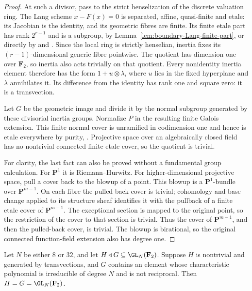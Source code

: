 \begin{proof}
At such a divisor, pass to the strict henselization of the discrete
valuation ring.  The Lang scheme $x-F(x)=0$ is separated, affine,
quasi-finite and etale: its Jacobian is the identity, and its
geometric fibres are finite.  Its finite etale part has rank
$2^{r-1}$ and is a subgroup, by
Lemma~\ref{lem:boundary-Lang-finite-part}, or directly by
\cite[Lemma~41.20.5]{Stacks0BTN} and
\cite[Lemma~58.8.2]{Stacks09ZS}.
Since the local ring is strictly henselian, inertia fixes its
$(r-1)$-dimensional generic fibre pointwise.  The quotient has
dimension one over $\mathbf F_2$, so inertia also acts trivially on
that quotient.  Every nonidentity inertia element therefore has
the form $1+u\otimes\lambda$, where $u$ lies in the fixed hyperplane
and $\lambda$ annihilates it.  Its difference from the identity has
rank one and square zero: it is a transvection.

Let $G$ be the geometric image and divide it by the normal subgroup
generated by these divisorial inertia groups.  Normalize $P$ in the
resulting finite Galois extension.  This finite normal cover is
unramified in codimension one and hence is etale everywhere by
purity, \cite[Lemma~58.21.4]{Stacks0BMB}.  Projective space over an
algebraically closed field has no nontrivial connected finite etale
cover, so the quotient is trivial.

For clarity, the last fact can also be proved without a fundamental
group calculation.  For $\mathbf P^1$ it is Riemann--Hurwitz.
For higher-dimensional projective space, pull a cover back to the
blowup of a point.  This blowup is a $\mathbf P^1$-bundle over
$\mathbf P^{m-1}$.  On each fibre the pulled-back cover is trivial;
cohomology and base change applied to its structure sheaf identifies
it with the pullback of a finite etale cover of $\mathbf P^{m-1}$.
The exceptional section is mapped to the original point, so the
restriction of the cover to that section is trivial.  Thus the
cover of $\mathbf P^{m-1}$, and then the pulled-back cover, is
trivial.  The blowup is birational, so the original connected
function-field extension also has degree one.
\end{proof}

\begin{lemma}
\label{lem:product-frobenius-group-test}
Let $N$ be either $8$ or $32$, and let
$H\triangleleft G\subseteq\GL_N(\mathbf F_2)$.
Suppose $H$ is nontrivial and generated by transvections, and
$G$ contains an element whose characteristic polynomial is
irreducible of degree $N$ and is not reciprocal.  Then
$H=G=\GL_N(\mathbf F_2)$.
\end{lemma}

